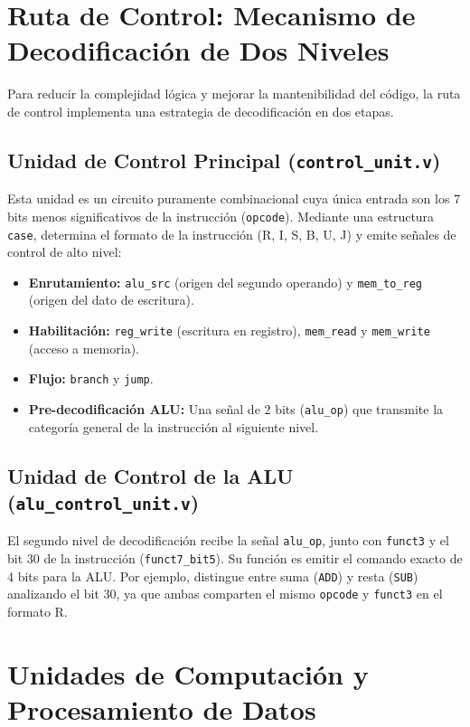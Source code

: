 \section{Ruta de Control: Mecanismo de Decodificación de Dos Niveles}
\label{sec:ControlPath}

Para reducir la complejidad lógica y mejorar la mantenibilidad del código, la ruta de control implementa una estrategia de decodificación en dos etapas.



\subsection{Unidad de Control Principal (\texttt{control\_unit.v})}
Esta unidad es un circuito puramente combinacional cuya única entrada son los 7 bits menos significativos de la instrucción (\texttt{opcode}). Mediante una estructura \texttt{case}, determina el formato de la instrucción (R, I, S, B, U, J) y emite señales de control de alto nivel:
\begin{itemize}
    \item \textbf{Enrutamiento:} \texttt{alu\_src} (origen del segundo operando) y \texttt{mem\_to\_reg} (origen del dato de escritura).
    \item \textbf{Habilitación:} \texttt{reg\_write} (escritura en registro), \texttt{mem\_read} y \texttt{mem\_write} (acceso a memoria).
    \item \textbf{Flujo:} \texttt{branch} y \texttt{jump}.
    \item \textbf{Pre-decodificación ALU:} Una señal de 2 bits (\texttt{alu\_op}) que transmite la categoría general de la instrucción al siguiente nivel.
\end{itemize}

\subsection{Unidad de Control de la ALU (\texttt{alu\_control\_unit.v})}
El segundo nivel de decodificación recibe la señal \texttt{alu\_op}, junto con \texttt{funct3} y el bit 30 de la instrucción (\texttt{funct7\_bit5}). Su función es emitir el comando exacto de 4 bits para la ALU. Por ejemplo, distingue entre suma (\texttt{ADD}) y resta (\texttt{SUB}) analizando el bit 30, ya que ambas comparten el mismo \texttt{opcode} y \texttt{funct3} en el formato R.

\section{Unidades de Computación y Procesamiento de Datos}
\label{sec:ComputeUnits}

